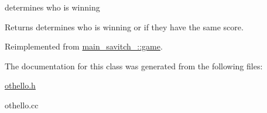 determines who is winning 

\begin{DoxyReturn}{Returns}
determines who is winning or if they have the same score. 
\end{DoxyReturn}


Reimplemented from \hyperlink{classmain__savitch__14_1_1game_a081611c42aa66b4d91bbefeec47c7c4e}{main\+\_\+savitch\+\_\+::game}.



The documentation for this class was generated from the following files\+:\begin{DoxyCompactItemize}
\item 
\hyperlink{othello_8h}{othello.\+h}\item 
othello.\+cc\end{DoxyCompactItemize}
